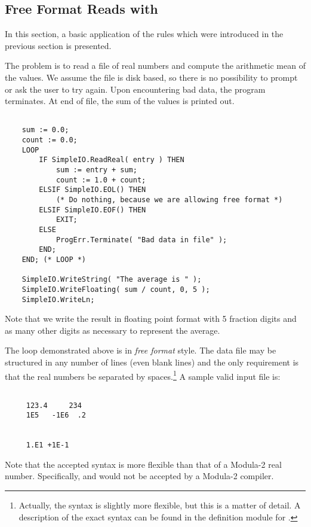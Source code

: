 \subsection{Free Format Reads with }
\label{FreeFormatSimpleIO}

In this section, a basic application of the rules which were introduced in
the previous section is presented. 

The problem is to read a file of 
real numbers
and compute the arithmetic mean of the values.  
We assume the file is 
disk based, so there is no possibility to prompt or ask the user to try again.
Upon encountering bad data, the program terminates.  At end of file,
the sum of the values is printed out.
\begin{verbatim}

    sum := 0.0;
    count := 0.0;
    LOOP
        IF SimpleIO.ReadReal( entry ) THEN
            sum := entry + sum;
            count := 1.0 + count;
        ELSIF SimpleIO.EOL() THEN
            (* Do nothing, because we are allowing free format *)
        ELSIF SimpleIO.EOF() THEN
            EXIT;
        ELSE
            ProgErr.Terminate( "Bad data in file" );
        END;
    END; (* LOOP *)
    
    SimpleIO.WriteString( "The average is " );
    SimpleIO.WriteFloating( sum / count, 0, 5 );
    SimpleIO.WriteLn;

\end{verbatim}
Note that we write the result in floating point format with 5 fraction
digits and as many other digits as necessary to represent the average.

The loop demonstrated above is in {\em free format} style.  The data
file may be structured in any number of lines (even blank lines) and
the only requirement is that the real numbers be separated by 
spaces.\footnote{
    Actually, the syntax is slightly more flexible, but this is a
    matter of detail.  A description of the exact  syntax can
    be found in the definition module for .
    }
A sample valid input file is:
\begin{verbatim}

     123.4     234
     1E5   -1E6  .2
     
     
     1.E1 +1E-1

\end{verbatim}
Note that the accepted syntax is more flexible than that of a Modula-2
real number.  Specifically,  and  would not be
accepted by a Modula-2 compiler.
     

